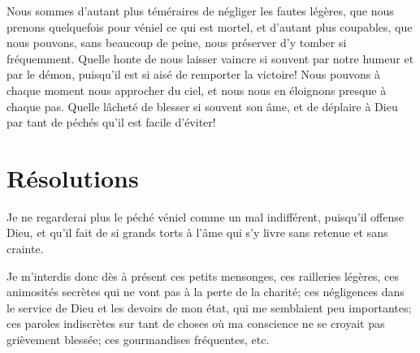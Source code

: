 \documentclass[instructions.tex]{subfiles}
\begin{document}
Nous sommes d'autant plus téméraires de négliger les fautes légères, que nous prenons quelquefois pour véniel ce qui est mortel, et d'autant plus coupables, que nous pouvons, sans beaucoup de peine, nous préserver d'y tomber si fréquemment. Quelle honte de nous laisser vaincre si souvent par notre humeur et par le démon, puisqu'il est si aisé de remporter la victoire! Nous pouvons à chaque moment nous approcher du ciel, et nous nous en éloignons presque à chaque pas. Quelle lâcheté de blesser si souvent son âme, et de déplaire à Dieu par tant de péchés qu'il est facile d'éviter!


\section{Résolutions}

\primo Je ne regarderai plus le péché véniel comme un mal indifférent, puisqu'il offense Dieu, et qu'il fait de si grands torts à l'âme qui s'y livre sans retenue et sans crainte.

\secundo Je m'interdis donc dès à présent ces petits mensonges, ces railleries légères, ces animosités secrètes qui ne vont pas à la perte de la charité; ces négligences dans le service de Dieu et les devoirs de mon état, qui me semblaient peu importantes; ces paroles indiscrètes sur tant de choses où ma conscience ne se croyait pas grièvement blessée; ces gourmandises fréquentes, etc.

\end{document}
